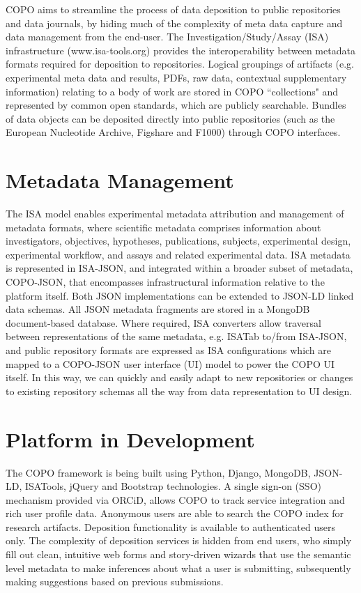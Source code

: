 \documentclass[runningheads,a4paper]{llncs}
\begin{document}
COPO aims to streamline the process of data deposition to public
repositories and data journals, by hiding much of the complexity of meta data capture and data management from the end-user. The Investigation/Study/Assay (ISA) infrastructure (www.isa-tools.org) provides the interoperability between metadata formats required for deposition to repositories. Logical groupings of artifacts (e.g. experimental meta data and results, PDFs, raw data, contextual supplementary information) relating to a body of work are stored in COPO ``collections" and represented by common open standards, which are publicly searchable. Bundles of data objects can be deposited directly into public repositories (such as the European Nucleotide Archive, Figshare and F1000) through COPO interfaces.



\vspace*{-0.3in}
\section{Metadata Management}

The ISA model enables experimental metadata attribution and management of metadata formats, where scientific metadata comprises information about investigators,
objectives, hypotheses, publications, subjects, experimental design,
experimental workflow, and assays and related experimental data. ISA
metadata is represented in ISA-JSON, and integrated within a broader
subset of metadata, COPO-JSON, that encompasses infrastructural
information relative to the platform itself. Both JSON implementations
can be extended to JSON-LD linked data schemas. All JSON metadata
fragments are stored in a MongoDB document-based database.
Where required, ISA converters allow traversal between representations
of the same metadata, e.g. ISATab to/from ISA-JSON, and public
repository formats are expressed as ISA configurations which are
mapped to a COPO-JSON user interface (UI) model to power the COPO UI
itself. In this way, we can quickly and easily adapt to new
repositories or changes to existing repository schemas all the way
from data representation to UI design.

\vspace*{-0.1in}
\section{Platform in Development}


The COPO framework is being built using Python, Django, MongoDB,
JSON-LD, ISATools, jQuery and Bootstrap technologies. A single sign-on (SSO) mechanism provided via ORCiD, allows COPO to track
service integration and rich user profile data. Anonymous users are
able to search the COPO index for research artifacts. Deposition functionality is available to authenticated users only. The complexity of deposition services is hidden from end users, who simply fill out clean, intuitive web forms and story-driven wizards that use the semantic level metadata to make inferences about what a user is submitting, subsequently making suggestions based on previous
submissions.
\end{document}
